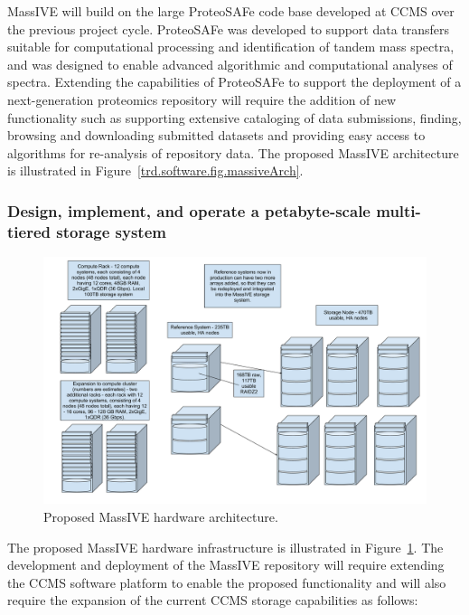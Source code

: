 \documentclass[arial,11pt]{article}
\begin{document}
MassIVE will build on the large ProteoSAFe code base developed at CCMS over the previous project cycle. ProteoSAFe was developed to support data transfers suitable for computational processing and identification of tandem mass spectra, and was designed to enable advanced algorithmic and  computational analyses of spectra. Extending the capabilities of ProteoSAFe to support the deployment of a next-generation proteomics repository will require the addition of new functionality such as supporting extensive cataloging of data submissions, finding, browsing and downloading submitted datasets and providing easy access to algorithms for re-analysis of repository data. The proposed MassIVE architecture is illustrated in Figure~\ref{trd.software.fig.massiveArch}.


\subsubsection{Design, implement, and operate a petabyte-scale multi-tiered storage system}

\begin{figure}[t]
  \centering
  \includegraphics[width=\textwidth]{figures/MassIVE_hardware.pdf}
  \caption{\footnotesize Proposed MassIVE hardware architecture.}
  \label{trd.software.fig.massiveHardware}
\end{figure}

The proposed MassIVE hardware infrastructure is illustrated in Figure~\ref{trd.software.fig.massiveHardware}. The development and deployment of the MassIVE repository will require extending the CCMS software platform to enable the proposed functionality and will also require the expansion of the current CCMS storage capabilities as follows:
\end{document}
